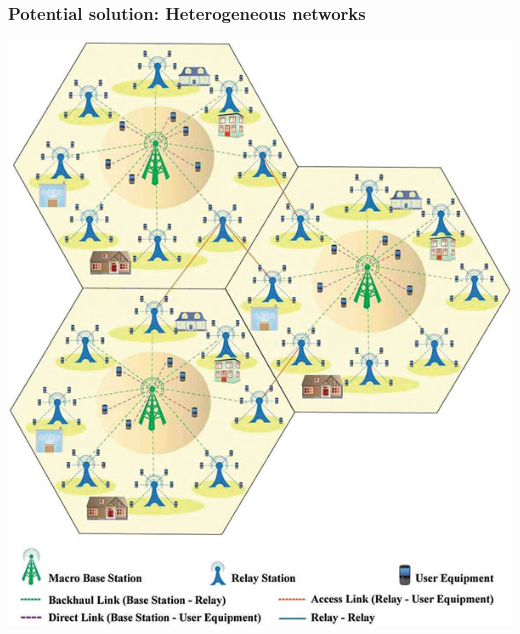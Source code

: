 \documentclass[a4paper,11pt,handout]{beamer}
\begin{document}
\begin{frame}
	\frametitle{Potential solution: Heterogeneous networks }

    \begin{center}
	\includegraphics[scale=0.7]{An_illustration_of_macro-relay_network}
	\end{center} 
\end{frame}
\note{

}
\end{document}
